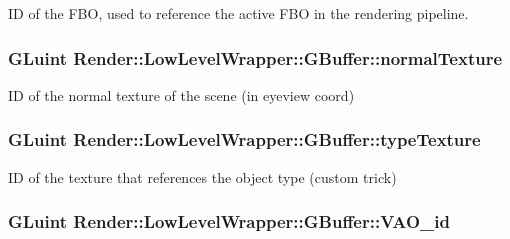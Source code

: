 ID of the F\+BO, used to reference the active F\+BO in the rendering pipeline. 

\subsubsection[{\texorpdfstring{normal\+Texture}{normalTexture}}]{\setlength{\rightskip}{0pt plus 5cm}G\+Luint Render\+::\+Low\+Level\+Wrapper\+::\+G\+Buffer\+::normal\+Texture}\hypertarget{struct_render_1_1_low_level_wrapper_1_1_g_buffer_a783de412de35f563a1a2d9627d533dd8}{}\label{struct_render_1_1_low_level_wrapper_1_1_g_buffer_a783de412de35f563a1a2d9627d533dd8}


ID of the normal texture of the scene (in eyeview coord) 

\subsubsection[{\texorpdfstring{type\+Texture}{typeTexture}}]{\setlength{\rightskip}{0pt plus 5cm}G\+Luint Render\+::\+Low\+Level\+Wrapper\+::\+G\+Buffer\+::type\+Texture}\hypertarget{struct_render_1_1_low_level_wrapper_1_1_g_buffer_aade11a19af8305cda85c90a46fea97c2}{}\label{struct_render_1_1_low_level_wrapper_1_1_g_buffer_aade11a19af8305cda85c90a46fea97c2}


ID of the texture that references the object type (custom trick) 

\subsubsection[{\texorpdfstring{V\+A\+O\+\_\+id}{VAO_id}}]{\setlength{\rightskip}{0pt plus 5cm}G\+Luint Render\+::\+Low\+Level\+Wrapper\+::\+G\+Buffer\+::\+V\+A\+O\+\_\+id}\hypertarget{struct_render_1_1_low_level_wrapper_1_1_g_buffer_a183d9f3483e625bc08a366966a9804d2}{}\label{struct_render_1_1_low_level_wrapper_1_1_g_buffer_a183d9f3483e625bc08a366966a9804d2}


